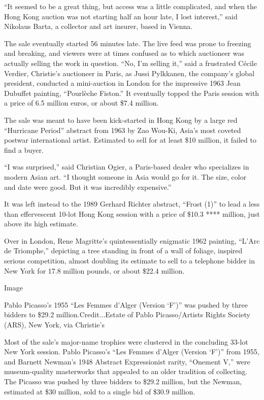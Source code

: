 ``It seemed to be a great thing, but access was a little complicated,
and when the Hong Kong auction was not starting half an hour late, I
lost interest,'' said Nikolaus Barta, a collector and art insurer, based
in Vienna.

The sale eventually started 56 minutes late. The live feed was prone to
freezing and breaking, and viewers were at times confused as to which
auctioneer was actually selling the work in question. ``No, I'm selling
it,'' said a frustrated Cécile Verdier, Christie's auctioneer in Paris,
as Jussi Pylkkanen, the company's global president, conducted a
mini-auction in London for the impressive 1963 Jean Dubuffet painting,
``Pourlèche Fiston.'' It eventually topped the Paris session with a
price of 6.5 million euros, or about \$7.4 million.

The sale was meant to have been kick-started in Hong Kong by a large red
``Hurricane Period'' abstract from 1963 by Zao Wou-Ki, Asia's most
coveted postwar international artist. Estimated to sell for at least
\$10 million, it failed to find a buyer.

``I was surprised,'' said Christian Ogier, a Paris-based dealer who
specializes in modern Asian art. ``I thought someone in Asia would go
for it. The size, color and date were good. But it was incredibly
expensive.''

It was left instead to the 1989 Gerhard Richter abstract, ``Frost (1)''
to lead a less than effervescent 10-lot Hong Kong session with a price
of \$10.3 **** million, just above its high estimate.

Over in London, Rene Magritte's quintessentially enigmatic 1962
painting, ``L'Arc de Triomphe,'' depicting a tree standing in front of a
wall of foliage, inspired serious competition, almost doubling its
estimate to sell to a telephone bidder in New York for 17.8 million
pounds, or about \$22.4 million.

Image

Pablo Picasso's 1955 ``Les Femmes d'Alger (Version `F')'' was pushed by
three bidders to \$29.2 million.Credit...Estate of Pablo Picasso/Artists
Rights Society (ARS), New York, via Christie's

Most of the sale's major-name trophies were clustered in the concluding
33-lot New York session. Pablo Picasso's ``Les Femmes d'Alger (Version
`F')'' from 1955, and Barnett Newman's 1948 Abstract Expressionist
rarity, ``Onement V,'' were museum-quality masterworks that appealed to
an older tradition of collecting. The Picasso was pushed by three
bidders to \$29.2 million, but the Newman, estimated at \$30 million,
sold to a single bid of \$30.9 million.

